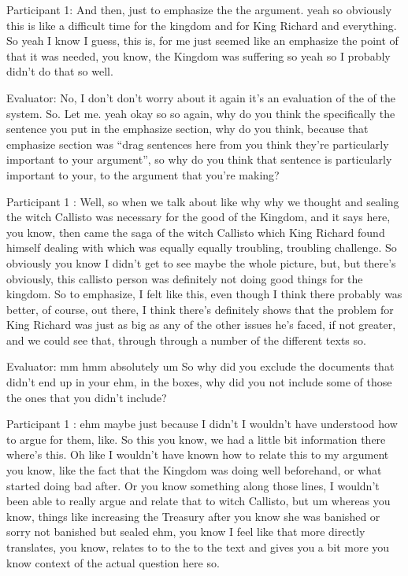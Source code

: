 \documentclass{l4proj}
\begin{document}
\begin{appendices}
 

Participant 1: And then, just to emphasize the the argument. yeah so obviously this is like a difficult time for the kingdom and for King Richard and everything. So yeah I know I guess, this is, for me just seemed like an emphasize the point of that it was needed, you know, the Kingdom was suffering so yeah so I probably didn't do that so well.

 

Evaluator: No, I don't don't worry about it again it's an evaluation of the of the system. So. Let me. yeah okay so so again, why do you think the specifically the sentence you put in the emphasize section, why do you think, because that emphasize section was “drag sentences here from you think they're particularly important to your argument”, so why do you think that sentence is particularly important to your, to the argument that you're making?

Participant 1 : Well, so when we talk about like why why we thought and sealing the witch Callisto was necessary for the good of the Kingdom, and it says here, you know, then came the saga of the witch Callisto which King Richard found himself dealing with which was equally equally troubling, troubling challenge. So obviously you know I didn't get to see maybe the whole picture, but, but there's obviously, this callisto person was definitely not doing good things for the kingdom. So to emphasize, I felt like this, even though I think there probably was better, of course, out there, I think there's definitely shows that the problem for King Richard was just as big as any of the other issues he's faced, if not greater, and we could see that, through through a number of the different texts so.

Evaluator: mm hmm absolutely um So why did you exclude the documents that didn't end up in your ehm, in the boxes, why did you not include some of those the ones that you didn't include?

Participant 1 : ehm maybe just because I didn't I wouldn't have understood how to argue for them, like. So this you know, we had a little bit information there where's this. Oh like I wouldn't have known how to relate this to my argument you know, like the fact that the Kingdom was doing well beforehand, or what started doing bad after. Or you know something along those lines, I wouldn't been able to really argue and relate that to witch Callisto, but um whereas you know, things like increasing the Treasury after you know she was banished or sorry not banished but sealed ehm, you know I feel like that more directly translates, you know, relates to to the to the text and gives you a bit more you know context of the actual question here so.


\end{appendices}
\end{document}
